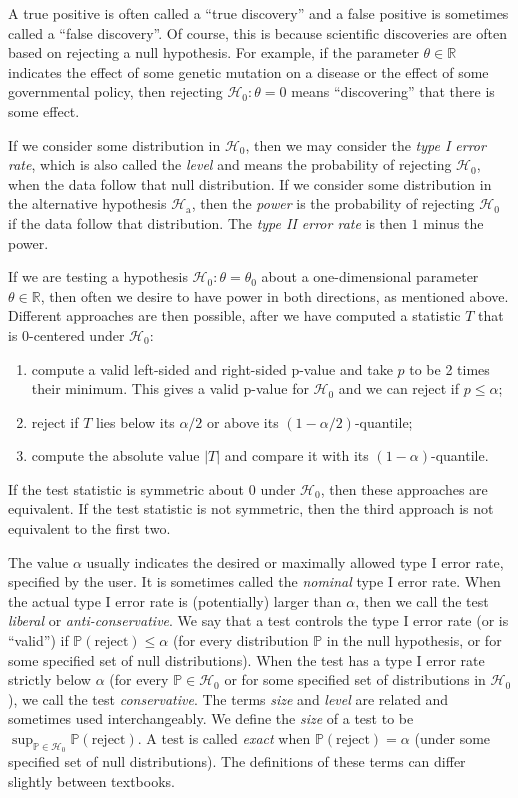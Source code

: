 \documentclass[11pt]{article}
\theoremstyle{plain}
\theoremstyle{definition}
\newcommand{\reals}{\mathbb{R}}
\newcommand{\Hy}{\mathcal{H}}
\newcommand{\pr}{\mathbb{P}}
\begin{document}
A true positive is often called a ``true discovery'' and a false positive is sometimes called a ``false discovery''.
Of course, this is because scientific discoveries are often based on rejecting a null hypothesis. For example, if the parameter $\theta\in \reals$ indicates the effect of some genetic mutation on a disease or the effect of some governmental policy, then rejecting $\Hy_0:\theta=0$ means ``discovering'' that there is some effect.


If we consider some distribution in $\Hy_0$, then we may consider the \emph{type I error rate}, which is also called the  \emph{level} and means the probability of rejecting $\Hy_0$, when the data follow that null distribution.
If we consider some distribution in the alternative hypothesis $\Hy_{\text{a}}$, then the \emph{power} is the probability of rejecting $\Hy_0$ if the data follow that distribution.
The \emph{type II error rate} is then $1$ minus the power.

If we are testing a hypothesis $\Hy_0: \theta=\theta_0$ about a one-dimensional parameter $\theta\in \reals$, then often we desire to have power in both directions, as mentioned above.  Different approaches are then possible, after we have computed a  statistic $T$ that is 0-centered under $\Hy_0$:
\begin{enumerate}
\item compute a valid left-sided and  right-sided p-value and take $p$ to be 2 times their minimum. This gives a valid p-value for $\Hy_0$ and we can reject if $p\leq \alpha$;
\item reject if $T$ lies below its $\alpha/2$ or above its $(1-\alpha/2)$-quantile;
\item compute the absolute value $|T|$ and compare it  with its $(1-\alpha)$-quantile.
\end{enumerate}
If the test statistic is symmetric about 0 under $\Hy_0$, then these approaches are equivalent. If the test statistic is not symmetric, then the third approach is not equivalent to the first two. 

The value $\alpha$ usually indicates the desired or maximally allowed type I error rate, specified by the user. It is sometimes called the \emph{nominal} type I error rate. When the actual type I error rate is (potentially) larger than $\alpha$, then we call the test \emph{liberal} or \emph{anti-conservative}. 
We say that a test controls the type I error rate (or is ``valid'') if $\pr(\text{reject})\leq \alpha$ (for every distribution $\pr$ in the null hypothesis, or for some specified set of null distributions). When the test  has a type I error rate strictly below $\alpha$ (for every $\pr\in \Hy_0$ or for some specified set of distributions in $\Hy_0$), we call the test \emph{conservative}. 
The terms \emph{size} and \emph{level} are related and sometimes used interchangeably.
We define the \emph{size} of a test to be $\sup_{\pr\in\Hy_0}\pr(\text{reject})$. 
A test is called \emph{exact}  when $\pr(\text{reject})=\alpha$ (under some specified set of null distributions). The definitions of these terms can differ slightly between textbooks.
\end{document}
